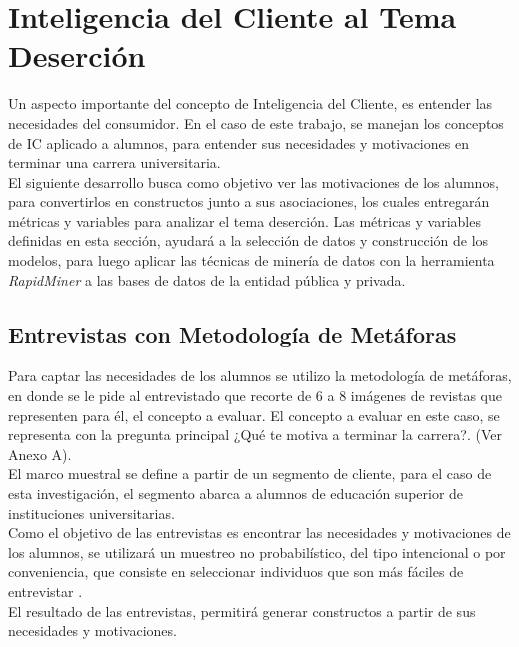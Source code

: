 \chapter[Inteligencia del Cliente al Tema Deserción]{Inteligencia del Cliente al Tema Deserción}
\label{ch:des}


Un aspecto importante del concepto de Inteligencia del Cliente, es entender las necesidades del consumidor. En el caso de este trabajo, se manejan los conceptos de IC aplicado a alumnos, para entender sus necesidades y motivaciones en terminar una carrera universitaria.\\

El siguiente desarrollo busca como objetivo ver las motivaciones de los alumnos, para convertirlos en constructos junto a sus asociaciones, los cuales entregarán métricas y variables para analizar el tema deserción. Las métricas y variables definidas en esta sección, ayudará a la selección de datos y construcción de los modelos, para luego aplicar las técnicas de minería de datos con la herramienta \textit{RapidMiner} a las bases de datos de la entidad pública y privada.

\section{Entrevistas con Metodología de Metáforas}


Para captar las necesidades de los alumnos se utilizo la metodología de metáforas, en donde se le pide al entrevistado que recorte de 6 a 8 imágenes de revistas que representen para él, el concepto a evaluar. El concepto a evaluar en este caso, se representa con la pregunta principal ¿Qué te motiva a terminar la carrera?. (Ver Anexo A).\\

El marco muestral se define a partir de un segmento de cliente, para el caso de esta investigación, el segmento abarca a alumnos de educación superior de instituciones universitarias.\\

Como el objetivo de las entrevistas es encontrar las necesidades y motivaciones de los alumnos, se utilizará un muestreo no probabilístico, del tipo intencional o por conveniencia, que consiste en seleccionar individuos que son más fáciles de entrevistar \cite{muestra}.\\

El resultado de las entrevistas, permitirá generar constructos a partir de sus necesidades y motivaciones.\\



